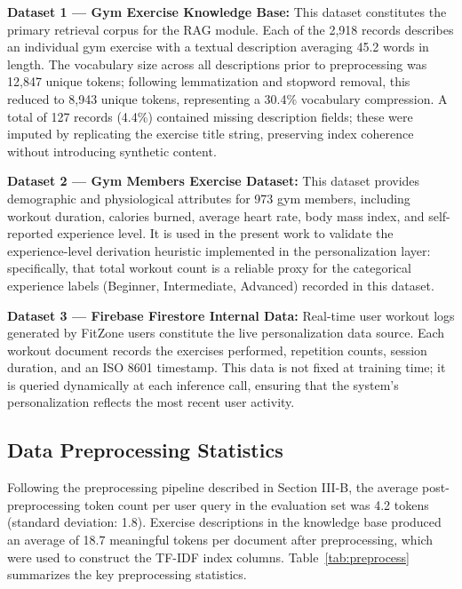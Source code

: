 \documentclass[conference]{IEEEtran}
\begin{document}
\textbf{Dataset 1 — Gym Exercise Knowledge Base:} This dataset constitutes the primary retrieval corpus for the RAG module. Each of the 2,918 records describes an individual gym exercise with a textual description averaging 45.2 words in length. The vocabulary size across all descriptions prior to preprocessing was 12,847 unique tokens; following lemmatization and stopword removal, this reduced to 8,943 unique tokens, representing a 30.4\% vocabulary compression. A total of 127 records (4.4\%) contained missing description fields; these were imputed by replicating the exercise title string, preserving index coherence without introducing synthetic content.

\textbf{Dataset 2 — Gym Members Exercise Dataset:} This dataset provides demographic and physiological attributes for 973 gym members, including workout duration, calories burned, average heart rate, body mass index, and self-reported experience level. It is used in the present work to validate the experience-level derivation heuristic implemented in the personalization layer: specifically, that total workout count is a reliable proxy for the categorical experience labels (Beginner, Intermediate, Advanced) recorded in this dataset.

\textbf{Dataset 3 — Firebase Firestore Internal Data:} Real-time user workout logs generated by FitZone users constitute the live personalization data source. Each workout document records the exercises performed, repetition counts, session duration, and an ISO 8601 timestamp. This data is not fixed at training time; it is queried dynamically at each inference call, ensuring that the system's personalization reflects the most recent user activity.

\subsection{Data Preprocessing Statistics}

Following the preprocessing pipeline described in Section III-B, the average post-preprocessing token count per user query in the evaluation set was 4.2 tokens (standard deviation: 1.8). Exercise descriptions in the knowledge base produced an average of 18.7 meaningful tokens per document after preprocessing, which were used to construct the TF-IDF index columns. Table~\ref{tab:preprocess} summarizes the key preprocessing statistics.
\end{document}
